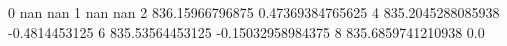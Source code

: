 0 nan nan
1 nan nan
2 836.15966796875 0.47369384765625
4 835.2045288085938 -0.4814453125
6 835.53564453125 -0.15032958984375
8 835.6859741210938 0.0
